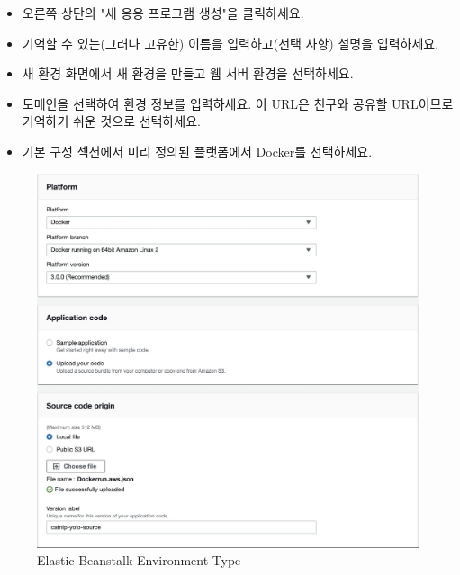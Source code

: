 \begin{itemize}
    \item 오른쪽 상단의 "새 응용 프로그램 생성"을 클릭하세요.
    \item 기억할 수 있는(그러나 고유한) 이름을 입력하고(선택 사항) 설명을 입력하세요.
    \item 새 환경 화면에서 새 환경을 만들고 웹 서버 환경을 선택하세요.
    \item 도메인을 선택하여 환경 정보를 입력하세요. 이 URL은 친구와 공유할 URL이므로 기억하기 쉬운 것으로 선택하세요.
    \item 기본 구성 섹션에서 미리 정의된 플랫폼에서 Docker를 선택하세요.
\end{itemize}

\begin{figure}
\includegraphics[width=\textwidth]{images/eb-docker.jpeg}
\caption{Elastic Beanstalk Environment Type}
\end{figure}


